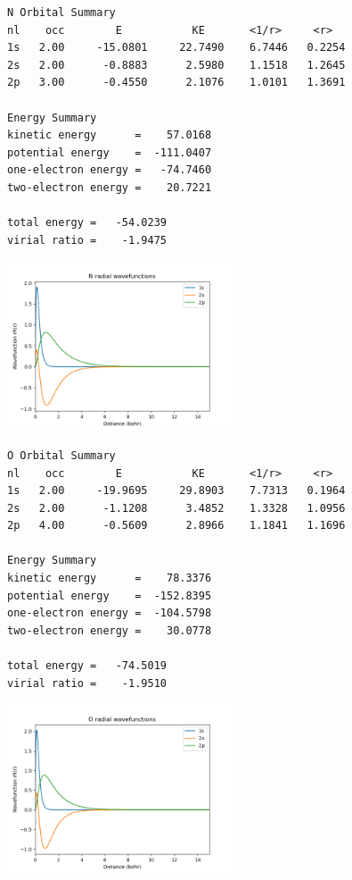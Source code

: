 \documentclass[11pt]{article}
\begin{document}
\label{}
\begin{verbatim}
N Orbital Summary
nl    occ        E           KE       <1/r>     <r>
1s   2.00     -15.0801     22.7490    6.7446   0.2254
2s   2.00      -0.8883      2.5980    1.1518   1.2645
2p   3.00      -0.4550      2.1076    1.0101   1.3691

Energy Summary
kinetic energy      =    57.0168
potential energy    =  -111.0407
one-electron energy =   -74.7460
two-electron energy =    20.7221

total energy =   -54.0239
virial ratio =    -1.9475
\end{verbatim}


\begin{center}
\includegraphics[width=0.5\textwidth]{./Images/N-wave-functions.png}
\end{center}


\label{}
\begin{verbatim}
O Orbital Summary
nl    occ        E           KE       <1/r>     <r>
1s   2.00     -19.9695     29.8903    7.7313   0.1964
2s   2.00      -1.1208      3.4852    1.3328   1.0956
2p   4.00      -0.5609      2.8966    1.1841   1.1696

Energy Summary
kinetic energy      =    78.3376
potential energy    =  -152.8395
one-electron energy =  -104.5798
two-electron energy =    30.0778

total energy =   -74.5019
virial ratio =    -1.9510
\end{verbatim}


\begin{center}
\includegraphics[width=0.5\textwidth]{./Images/O-wave-functions.png}
\end{center}
\end{document}
